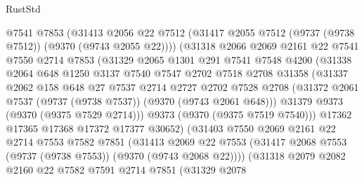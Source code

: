 \begin{lexlean}{RustStd}
\begin{coremodule}
{\begin{coremodule}
{{{{{{{{{{{{{{{{{{{{{{{{{{{{{{{{{{{{{{{                  @7541
                  @7853
                  (@31413
                    @2056
                    @22
                    @7512
                    (@31417 @2055 @7512 (@9737 (@9738 @7512)) (@9370 (@9743 @2055 @22))))
                  (@31318
                    @2066
                    @2069
                    @2161
                    @22
                    @7541
                    @7550
                    @2714
                    @7853
                    (@31329
                      @2065
                      @1301
                      @291
                      @7541
                      @7548
                      @4200
                      (@31338
                        @2064
                        @648
                        @1250
                        @3137
                        @7540
                        @7547
                        @2702
                        @7518
                        @2708
                        @31358
                        (@31337
                          @2062
                          @158
                          @648
                          @27
                          @7537
                          @2714
                          @2727
                          @2702
                          @7528
                          @2708
                          (@31372 @2061 @7537 (@9737 (@9738 @7537)) (@9370 (@9743 @2061 @648)))
                          @31379
                          @9373
                          (@9370 (@9375 @7529 @2714)))
                        @9373
                        (@9370 (@9375 @7519 @7540)))
                      @17362
                      @17365
                      @17368
                      @17372
                      @17377
                      @30652)
                    (@31403
                      @7550
                      @2069
                      @2161
                      @22
                      @2714
                      @7553
                      @7582
                      @7851
                      (@31413
                        @2069
                        @22
                        @7553
                        (@31417 @2068 @7553 (@9737 (@9738 @7553)) (@9370 (@9743 @2068 @22))))
                      (@31318
                        @2079
                        @2082
                        @2160
                        @22
                        @7582
                        @7591
                        @2714
                        @7851
                        (@31329
                          @2078
}}}}}}}}}}}}}}}}}}}}}}}}}}}}}}}}}}}}}}}
\end{coremodule}}
\end{coremodule}
\end{lexlean}

